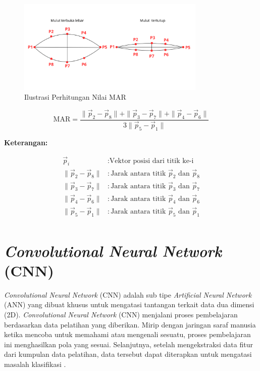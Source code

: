     \begin{figure}[H]
      \centering
      \includegraphics[width=0.8\textwidth]{figures/bab2/mar.png}
      \caption{Ilustrasi Perhitungan Nilai MAR}
      \label{Ilustrasi Perhitungan Nilai MAR}
    \end{figure}

     \begin{equation}
    \label{rumus mar}
    \text{MAR} = \frac{\| \vec{p}_2 - \vec{p}_8 \| + \| \vec{p}_3 - \vec{p}_7 \| + \| \vec{p}_4 - \vec{p}_6 \| }{3 \| \vec{p}_5 - \vec{p}_1 \|}
\end{equation}


      \textbf{Keterangan:}
      
    \begin{align*}
        \vec{p}_i & : \text{Vektor posisi dari titik ke-i} \\
        \|\vec{p}_2 - \vec{p}_8\| & : \text{Jarak antara titik } \vec{p}_2 \text{ dan } \vec{p}_8 \\
        \|\vec{p}_3 - \vec{p}_7\| & : \text{Jarak antara titik } \vec{p}_3 \text{ dan } \vec{p}_7 \\
        \|\vec{p}_4 - \vec{p}_6\| & : \text{Jarak antara titik } \vec{p}_4 \text{ dan } \vec{p}_6 \\
        \|\vec{p}_5 - \vec{p}_1\| & : \text{Jarak antara titik } \vec{p}_5 \text{ dan } \vec{p}_1 \\
    \end{align*}



    

\section{\textit{Convolutional Neural Network} (CNN)}

    \textit{Convolutional Neural Network} (CNN) adalah sub tipe \textit{Artificial Neural Network} (ANN) yang
     dibuat khusus untuk mengatasi tantangan terkait data dua dimensi (2D). \textit{Convolutional Neural Network}
      (CNN) menjalani proses pembelajaran berdasarkan data pelatihan yang diberikan. Mirip dengan jaringan saraf
       manusia ketika mencoba untuk memahami atau mengenali sesuatu, proses pembelajaran ini menghasilkan pola
        yang sesuai. Selanjutnya, setelah mengekstraksi data fitur dari kumpulan data pelatihan, data tersebut
         dapat diterapkan untuk mengatasi masalah klasifikasi \cite{Alzubaidi2021}. 
    
